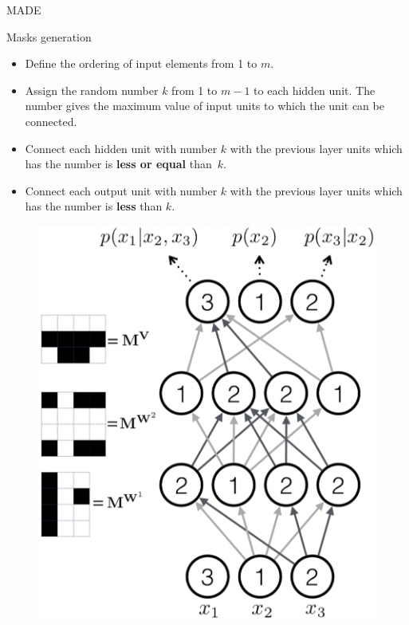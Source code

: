 \begin{frame}{MADE}
		\begin{minipage}[t]{0.65\columnwidth}
		    \vspace{-0.5cm}
			\begin{block}{Masks generation}
				\begin{itemize}
					\item Define the ordering of input elements from 1 to $m$.
					\item Assign the random number $k$ from 1 to $m - 1$ to each hidden unit. The number gives the
					maximum value of input units to which the unit can be connected.
					\item Connect each hidden unit with number $k$ with the previous layer units which has the number is \textbf{less or equal} than~$k$.
					\item Connect each output unit with number $k$ with the previous layer units which has the number is \textbf{less} than $k$.
				\end{itemize}
			\end{block}
		\end{minipage}%
		\begin{minipage}[t]{0.33\columnwidth}
			\vspace{2cm}
			\begin{figure}
				\centering
				\includegraphics[width=1.0\linewidth]{figs/made2}
			\end{figure}
		\end{minipage}
\end{frame}
